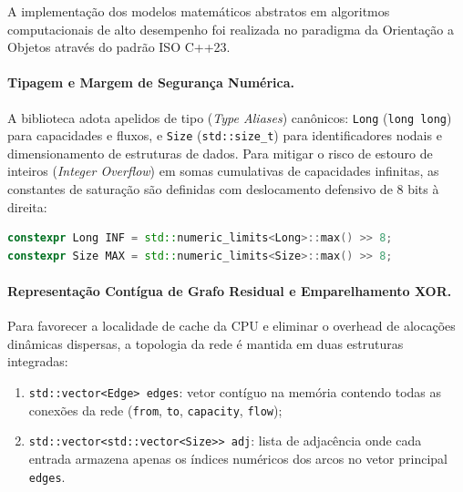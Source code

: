 \label{ap:arquitetura}

A implementação dos modelos matemáticos abstratos em algoritmos computacionais de alto desempenho foi realizada no paradigma da Orientação a Objetos através do padrão ISO C++23.

\paragraph{Tipagem e Margem de Segurança Numérica.}
A biblioteca adota apelidos de tipo (\textit{Type Aliases}) canônicos: \lstinline{Long} (\lstinline{long long}) para capacidades e fluxos, e \lstinline{Size} (\lstinline{std::size_t}) para identificadores nodais e dimensionamento de estruturas de dados. Para mitigar o risco de estouro de inteiros (\textit{Integer Overflow}) em somas cumulativas de capacidades infinitas, as constantes de saturação são definidas com deslocamento defensivo de 8 bits à direita:
\begin{lstlisting}[language=C++, numbers=none, basicstyle=\ttfamily\footnotesize, frame=none, backgroundcolor=\color{white}]
constexpr Long INF = std::numeric_limits<Long>::max() >> 8;
constexpr Size MAX = std::numeric_limits<Size>::max() >> 8;
\end{lstlisting}

\paragraph{Representação Contígua de Grafo Residual e Emparelhamento XOR.}
Para favorecer a localidade de cache da CPU e eliminar o overhead de alocações dinâmicas dispersas, a topologia da rede é mantida em duas estruturas integradas:
\begin{enumerate}
    \item \lstinline{std::vector<Edge> edges}: vetor contíguo na memória contendo todas as conexões da rede (\lstinline{from}, \lstinline{to}, \lstinline{capacity}, \lstinline{flow});
    \item \lstinline{std::vector<std::vector<Size>> adj}: lista de adjacência onde cada entrada armazena apenas os índices numéricos dos arcos no vetor principal \lstinline{edges}.
\end{enumerate}

